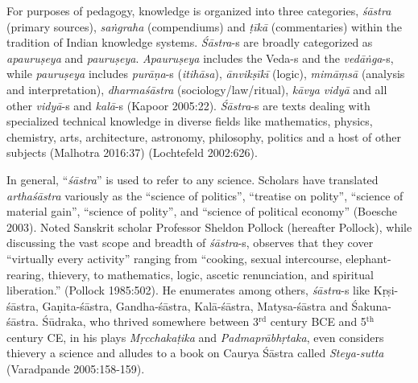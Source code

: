 For purposes of pedagogy, knowledge is organized into three categories, {\sl śāstra} (primary sources), {\sl saṅgraha} (compendiums) and {\sl ṭīkā} (commentaries) within the tradition of Indian knowledge systems. {\sl Śāstra}-s are broadly categorized as {\sl apauruṣeya} and {\sl pauruṣeya}. {\sl Apauruṣeya} includes the Veda-s and the {\sl vedāṅga}-s, while {\sl pauruṣeya} includes {\sl purāṇa}-s ({\sl itihāsa}), {\sl ānvikṣīkī} (logic), {\sl mimāṃsā} (analysis and interpretation), {\sl dharmaśāstra} (sociology/law/ritual), {\sl kāvya vidyā} and all other {\sl vidyā}-s and {\sl kalā}-s (Kapoor 2005:22). {\sl Śāstra}-s are texts dealing with specialized technical knowledge in diverse fields like mathematics, physics, chemistry, arts, architecture, astronomy, philosophy, politics and a host of other subjects (Malhotra 2016:37) (Lochtefeld 2002:626). 

In general, ``{\sl śāstra}'' is used to refer to any science. Scholars have translated {\sl arthaśāstra} variously as the ``science of politics'', ``treatise on polity'', ``science of material gain'', ``science of polity'', and ``science of political economy'' (Boesche 2003). Noted Sanskrit scholar Professor Sheldon Pollock (hereafter Pollock), while discussing the vast scope and breadth of {\sl śāstra}-s, observes that they cover ``virtually every activity'' ranging from ``cooking, sexual intercourse, elephant-rearing, thievery, to mathematics, logic, ascetic renunciation, and spiritual liberation.'' (Pollock 1985:502). He enumerates among others, {\sl śāstra}-s like Kṛṣi-śāstra, Gaṇita-śāstra, Gandha-śāstra, Kalā-śāstra, Matysa-śāstra and Śakuna-śāstra. Śūdraka, who thrived somewhere between 3$^{\text{rd}}$ century BCE and 5$^{\text{th}}$ century CE, in his plays {\sl Mṛcchakaṭika} and {\sl Padmaprābhṛtaka}, even considers thievery a science and alludes to a book on Caurya Śāstra called {\sl Steya-sutta} (Varadpande 2005:158-159).

